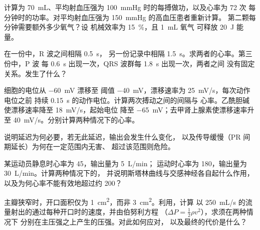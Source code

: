 \begin{exercise}[$\star\star$]\label{exo:b2:heart:6}
计算为 \qty{70}{mL}、平均射血压强为
\qty{100}{mmHg} 时的每搏做功，以及心率为 72 次
每分钟时的功率。对平均射血压强为 \qty{150}{mmHg} 的高血压患者重新计算。
第二颗每分钟需要额外多少氧气？设
机械效率为 \qty{15}{\%}，且 \qty{1}{mL} 氧气
可释放 \qty{20}{J} 能量。
\end{exercise}

\begin{exercise}[$\star\star$]\label{exo:b2:heart:7}
在一份中，R 波之间相隔 \qty{0.5}{s}，
另一份记录中相隔 \qty{1.5}{s}。求两者的心率。第三份中，P 波
每 \qty{0.6}{s} 出现一次，QRS 波群每 \qty{1.8}{s} 出现一次，两者之间
没有固定关系。发生了什么？
\end{exercise}

\begin{exercise}[$\star\star$]\label{exo:b2:heart:8}
细胞的电位从 \qty{-60}{mV} 漂移至
阈值 \qty{-40}{mV}，漂移速率为 \qty{25}{mV/s}，每次动作电位之前
持续 \qty{0.15}{s} 的动作电位。计算两次搏动之间的间隔与
心率。乙酰胆碱使漂移速率降至 \qty{18}{mV/s}，起始电位
降至 \qty{-65}{mV}；去甲肾上腺素使漂移速率升至
\qty{40}{mV/s}。分别计算两种情况下的心率。
\end{exercise}

\begin{exercise}[$\star\star$]\label{exo:b2:heart:9}
说明延迟为何必要，若无此延迟，输出会发生什么变化，
以及传导缓慢（PR 间期延长）为何在一定范围内无害、
超过该范围则危险。
\end{exercise}

\begin{exercise}[$\star\star\star$]\label{exo:b2:heart:10}
某运动员静息时心率为 45，输出量为 \qty{5}{L/min}；
运动时心率为 180，输出量为 \qty{30}{L/min}。计算两种情况下的，
并说明斯塔林曲线与交感神经各自起什么作用，
以及为何心率不能有效地超过约 200？
\end{exercise}

\begin{exercise}[$\star\star\star$]\label{exo:b2:heart:11}
主瓣狭窄时，开口面积仅为 \qty{1}{cm^2}，而非
\qty{3}{cm^2}。利用，计算
以 \qty{250}{mL/s} 的流量射出的通过每种开口时的速度，并由伯努利方程
（$\Delta P = \tfrac12\rho v^2$），求须在两种情况下
分别在主压强之上产生的压强。对此如何应对，
以及最终的代价是什么？
\end{exercise}

